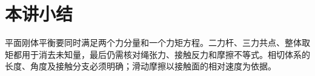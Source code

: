 \section{本讲小结}
平面刚体平衡要同时满足两个力分量和一个力矩方程。二力杆、三力共点、整体取矩都用于消去未知量，最后仍需核对绳张力、接触反力和摩擦不等式。相切体系的长度、角度及接触分支必须明确；滑动摩擦以接触面的相对速度为依据。
